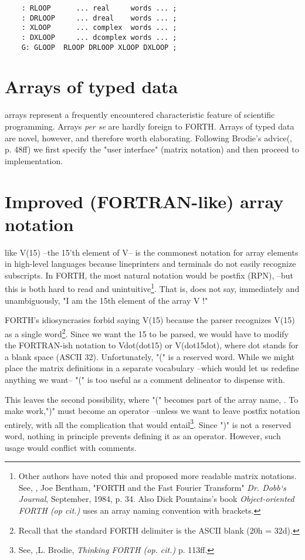 \begin{lstlisting}
    : RLOOP      ... real     words ... ;
    : DRLOOP     ... dreal    words ... ;
    : XLOOP      ... complex  words ... ;
    : DXLOOP     ... dcomplex words ... ;
    G: GLOOP  RLOOP DRLOOP XLOOP DXLOOP ;
\end{lstlisting}

\section{Arrays of typed data}

 arrays represent a frequently encountered characteristic feature of scientific programming. Arrays \textit{per se} are hardly foreign to FORTH. Arrays of typed data are novel, however, and therefore worth elaborating. Following Brodie's advice(\TF, p. 48ff) we first specify the "user interface" (matrix notation) and then proceed to implementation.

\section{Improved (FORTRAN-like) array notation}
 like V(15) --the 15'th element of V-- is the commonest notation for array elements in high-level languages because lineprinters and terminals do not easily recognize subscripts. In FORTH, the most natural notation would be postfix (RPN),  --but this is both hard to read and unintuitive\footnote{Other authors have noted this and proposed more readable matrix notations. See, \eg, Joe Bentham, "FORTH and the Fast Fourier Transform" \textit{Dr. Dobb‘s Journal}, September, 1984, p. 34. Also Dick Pountains's book \textit{Object-oriented FORTH (op cit.)} uses an array naming convention with brackets.}. That is,  does not say, immediately and unambiguously, "I am the 15th element of the array V !"

FORTH's idiosyncrasies forbid saying V(15) because the parser recognizes V(15) as a single word\footnote{Recall that the standard FORTH delimiter is the ASCII blank (20h = 32d).}. Since we want the 15 to be parsed, we would have to modify the FORTRAN-ish notation to Vdot(dot15) or V(dot15dot), where dot stands for a blank space (ASCII 32). Unfortunately, "(" is a reserved word. While we might place the matrix definitions in a separate vocabulary --which would let us redefine anything we want-- "(" is too useful as a comment delineator to dispense with.

This leaves the second possibility, where "(" becomes part of the array name, . To make  work,")" must become an operator --unless we want to leave postfix notation entirely, with all the complication that would entail\footnote{See, \eg,L. Brodie, \textit{Thinking FORTH (op. cit.)} p. 113ff.}. Since ")" is not a reserved word, nothing in principle prevents defining it as an operator. However, such usage would conflict with comments.

